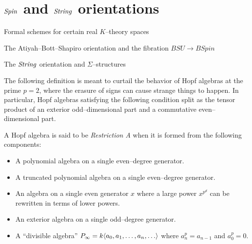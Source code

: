 





\section{$\mathit{Spin}$ and $\mathit{String}$ orientations}

Formal schemes for certain real $K$--theory spaces

The Atiyah--Bott--Shapiro orientation and the fibration $BSU \to BSpin$ 

The $\mathit{String}$ orientation and $\Sigma$--structures




The following definition is meant to curtail the behavior of Hopf algebras at the prime $p = 2$, where the erasure of signs can cause strange things to happen.  In particular, Hopf algebras satisfying the following condition split as the tensor product of an exterior odd--dimensional part and a commutative even--dimensional part.

\begin{definition}
A Hopf algebra is said to be \textit{Restriction A} when it is formed from the following components:
\begin{itemize}
\item A polynomial algebra on a single even--degree generator.
\item A truncated polynomial algebra on a single even--degree generator.
\item An algebra on a single even generator $x$ where a large power $x^{p^d}$ can be rewritten in terms of lower powers.
\item An exterior algebra on a single odd--degree generator.
\item A ``divisible algebra'' $P_\infty = k\langle a_0, a_1, \ldots, a_n, \ldots\rangle$ where $a_n^p = a_{n-1}$ and $a_0^p = 0$. 
\end{itemize}
\end{definition}

